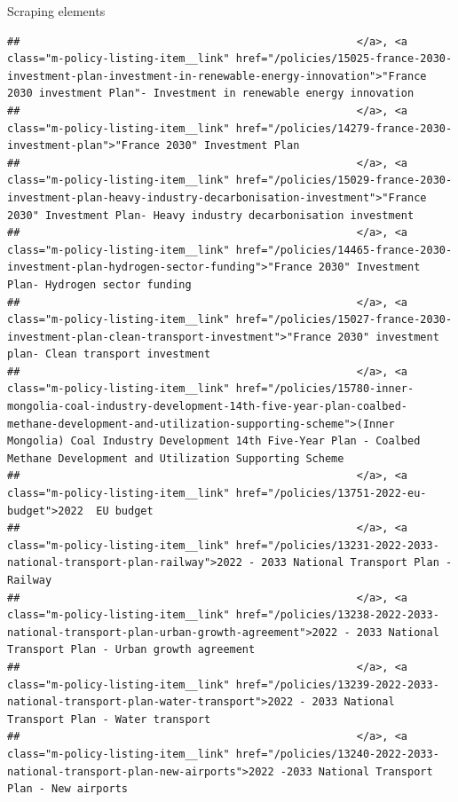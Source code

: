 \documentclass[
  10pt,
  ignorenonframetext,
  aspectratio=169]{beamer}
\begin{document}
\begin{frame}[fragile]{Scraping elements}
\begin{verbatim}
##                                                     </a>, <a class="m-policy-listing-item__link" href="/policies/15025-france-2030-investment-plan-investment-in-renewable-energy-innovation">"France 2030 investment Plan"- Investment in renewable energy innovation 
##                                                     </a>, <a class="m-policy-listing-item__link" href="/policies/14279-france-2030-investment-plan">"France 2030" Investment Plan
##                                                     </a>, <a class="m-policy-listing-item__link" href="/policies/15029-france-2030-investment-plan-heavy-industry-decarbonisation-investment">"France 2030" Investment Plan- Heavy industry decarbonisation investment
##                                                     </a>, <a class="m-policy-listing-item__link" href="/policies/14465-france-2030-investment-plan-hydrogen-sector-funding">"France 2030" Investment Plan- Hydrogen sector funding
##                                                     </a>, <a class="m-policy-listing-item__link" href="/policies/15027-france-2030-investment-plan-clean-transport-investment">"France 2030" investment plan- Clean transport investment
##                                                     </a>, <a class="m-policy-listing-item__link" href="/policies/15780-inner-mongolia-coal-industry-development-14th-five-year-plan-coalbed-methane-development-and-utilization-supporting-scheme">(Inner Mongolia) Coal Industry Development 14th Five-Year Plan - Coalbed Methane Development and Utilization Supporting Scheme
##                                                     </a>, <a class="m-policy-listing-item__link" href="/policies/13751-2022-eu-budget">2022  EU budget
##                                                     </a>, <a class="m-policy-listing-item__link" href="/policies/13231-2022-2033-national-transport-plan-railway">2022 - 2033 National Transport Plan - Railway
##                                                     </a>, <a class="m-policy-listing-item__link" href="/policies/13238-2022-2033-national-transport-plan-urban-growth-agreement">2022 - 2033 National Transport Plan - Urban growth agreement
##                                                     </a>, <a class="m-policy-listing-item__link" href="/policies/13239-2022-2033-national-transport-plan-water-transport">2022 - 2033 National Transport Plan - Water transport
##                                                     </a>, <a class="m-policy-listing-item__link" href="/policies/13240-2022-2033-national-transport-plan-new-airports">2022 -2033 National Transport Plan - New airports

\end{verbatim}
\end{frame}
\end{document}
